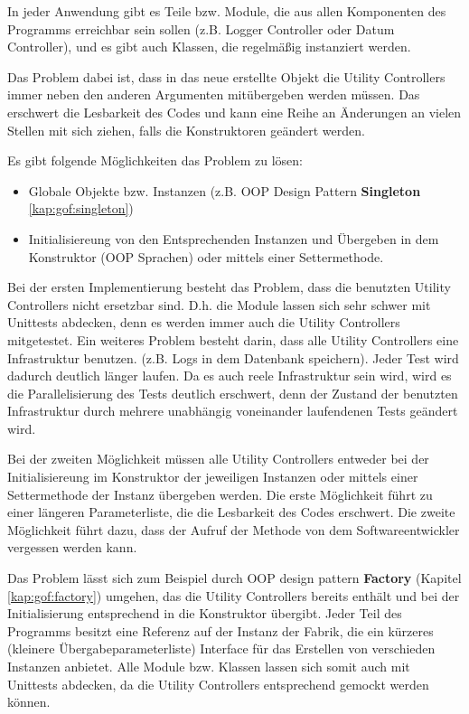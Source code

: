 In jeder Anwendung gibt es Teile bzw. Module, die aus allen Komponenten des Programms erreichbar sein sollen
(z.B. Logger Controller oder Datum Controller), und es gibt auch Klassen, die regelmäßig instanziert werden.

Das Problem dabei ist, dass in das neue erstellte Objekt die Utility Controllers immer neben den anderen Argumenten 
mitübergeben werden müssen. Das erschwert die Lesbarkeit des Codes und kann eine Reihe an Änderungen an vielen Stellen mit sich ziehen,
falls die Konstruktoren geändert werden.

Es gibt folgende Möglichkeiten das Problem zu lösen:
\begin{itemize}
    \item Globale Objekte bzw. Instanzen (z.B. OOP Design Pattern \textbf{Singleton} \ref{kap:gof:singleton})
    \item Initialisiereung von den Entsprechenden Instanzen und Übergeben in dem Konstruktor (OOP Sprachen)
    oder mittels einer Settermethode.
\end{itemize}

Bei der ersten Implementierung besteht das Problem, dass die benutzten Utility Controllers nicht ersetzbar sind.
D.h. die Module lassen sich sehr schwer mit Unittests abdecken, denn es werden immer auch die Utility Controllers mitgetestet.
Ein weiteres Problem besteht darin, dass alle Utility Controllers eine Infrastruktur benutzen.
(z.B. Logs in dem Datenbank speichern). Jeder Test wird dadurch deutlich länger laufen.
Da es auch reele Infrastruktur sein wird, wird es die Parallelisierung des Tests deutlich erschwert, denn 
der Zustand der benutzten Infrastruktur durch mehrere unabhängig voneinander laufendenen Tests geändert wird.

Bei der zweiten Möglichkeit müssen alle Utility Controllers entweder bei der Initialisiereung im Konstruktor 
der jeweiligen Instanzen oder mittels einer Settermethode der Instanz übergeben werden.
Die erste Möglichkeit führt zu einer längeren Parameterliste, die die Lesbarkeit des Codes erschwert.
Die zweite Möglichkeit führt dazu, dass der Aufruf der Methode von dem Softwareentwickler vergessen werden kann.

Das Problem lässt sich zum Beispiel durch OOP design pattern \textbf{Factory} (Kapitel \ref{kap:gof:factory}) umgehen, das die Utility Controllers bereits
enthält und bei der Initialisierung entsprechend in die Konstruktor übergibt. 
Jeder Teil des Programms besitzt eine Referenz auf der Instanz der Fabrik, 
die ein kürzeres (kleinere Übergabeparameterliste) Interface für das Erstellen von verschieden Instanzen anbietet.
Alle Module bzw. Klassen lassen sich somit auch mit Unittests
abdecken, da die Utility Controllers entsprechend gemockt werden können. 

